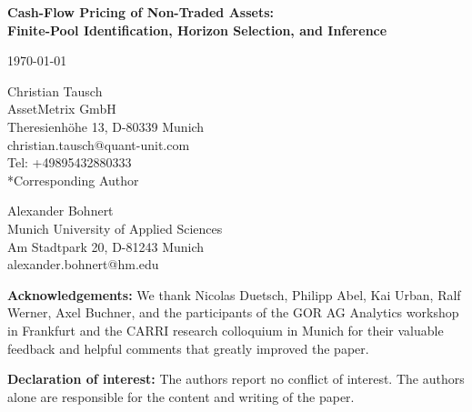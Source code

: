 
\begin{titlepage}
	
	
\ifSubmissionMode
\thispagestyle{plain}
\setcounter{page}{1}
\fi

\begin{center}
{\Large\bfseries Cash-Flow Pricing of Non-Traded Assets: \\[0.5ex] Finite-Pool Identification, Horizon Selection, and Inference\par}

\vspace{0.8in}

\unless\ifSubmissionMode
\today
\fi

\vspace{0.8in}

Christian Tausch\\
AssetMetrix GmbH\\
Theresienh\"{o}he 13, D-80339 Munich\\
christian.tausch@quant-unit.com\\
\ifSubmissionMode
	Tel: +49895432880333\\
	*Corresponding Author
\fi

\vspace{2em}

Alexander Bohnert\\
Munich University of Applied Sciences\\
Am Stadtpark 20, D-81243 Munich\\
alexander.bohnert@hm.edu\\
\end{center}

\vfill

\unless\ifSubmissionMode

\noindent\textbf{Acknowledgements:} We thank Nicolas Duetsch, Philipp Abel, Kai Urban, Ralf Werner, Axel Buchner, and the participants of the GOR AG Analytics workshop in Frankfurt and the CARRI research colloquium in Munich for their valuable feedback and helpful comments that greatly improved the paper.

\medskip

\noindent\textbf{Declaration of interest:} The authors report no conflict of interest. The authors alone are responsible for the content and writing of the paper.

\fi

\end{titlepage}